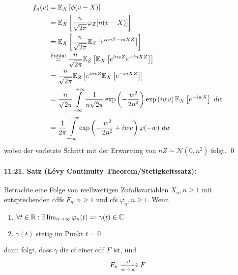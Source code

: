 \begin{align*}
    f_n(v)&=\E_X\left[\phi(v-X)\right]\\
    &=\E_X\left[\dfrac{n}{\sqrt{2\pi}}\varphi_Z[n(v-X)]\right] \\
    &=\E_X\left[\dfrac{n}{\sqrt{2\pi}}\E_Z\left[e^{invZ-inXZ}\right]\right]\\
    &\overset{\text{Fubini}}{=}\dfrac{n}{\sqrt{2\pi}}\E_Z\left[\E_X\left[e^{invZ}e^{-inXZ}\right]\right]\\
    &=\dfrac{n}{\sqrt{2\pi}}\E_Z\left[e^{invZ}\E_X\left[e^{-inXZ}\right]\right] \\
    &=\dfrac{n}{\sqrt{2\pi}}\int\displaylimits_{-\infty}^{+\infty}\dfrac{1}{n\sqrt{2\pi}}\exp\left(-\dfrac{w^2}{2n^2}\right)\exp\left(iwv\right)\E_X\left[e^{-iwX}\right] \ dw \\
    &=\dfrac{1}{2\pi}\int\displaylimits_{-\infty}^{+\infty}\exp\left(-\dfrac{w^2}{2n^2}+iwv\right)\varphi(-w)\ dw
\end{align*}
wobei der vorletzte Schritt mit der Erwartung von $nZ\sim\mathcal{N}(0,n^2)$ folgt. \qed

\paragraph{11.21. Satz (L\'evy Continuity Theorem/Stetigkeitssatz):} Betrachte eine Folge von reellwertigen Zufallsvariablen $X_n,n\geq1$ mit entsprechenden cdfs $F_n,n\geq1$ und cfs $\varphi_n,n\geq1$. Wenn
\begin{enumerate}[label=(\roman*)]
    \item $\forall t\in\mathbb{R}: \exists\lim_{n\to\infty}\varphi_n(t)=:\gamma(t)\in\mathbb{C}$
    \item $\gamma(t)$ stetig im Punkt $t=0$
\end{enumerate}
dann folgt, dass $\gamma$ die cf einer cdf $F$ ist, und
$$F_n\nto{d}{n\to\infty}F$$

